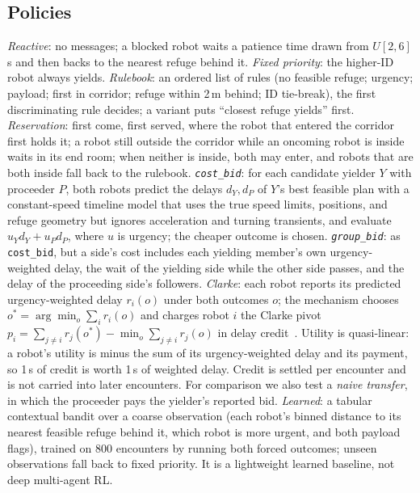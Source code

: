\documentclass[letterpaper,journal]{IEEEtran}
\newcommand{\cb}{\texttt{cost\_bid}}
\newcommand{\gb}{\texttt{group\_bid}}
\begin{document}
\subsection{Policies}\label{sec:pol}
\emph{Reactive}: no messages; a blocked robot waits a patience time drawn from $U[2,6]$\,s and then backs to the nearest refuge behind it. \emph{Fixed priority}: the higher-ID robot always yields. \emph{Rulebook}: an ordered list of rules (no feasible refuge; urgency; payload; first in corridor; refuge within 2\,m behind; ID tie-break), the first discriminating rule decides; a variant puts ``closest refuge yields'' first. \emph{Reservation}: first come, first served, where the robot that entered the corridor first holds it; a robot still outside the corridor while an oncoming robot is inside waits in its end room; when neither is inside, both may enter, and robots that are both inside fall back to the rulebook. \emph{\cb}: for each candidate yielder $Y$ with proceeder $P$, both robots predict the delays $d_Y,d_P$ of $Y$'s best feasible plan with a constant-speed timeline model that uses the true speed limits, positions, and refuge geometry but ignores acceleration and turning transients, and evaluate $u_Y d_Y+u_P d_P$, where $u$ is urgency; the cheaper outcome is chosen. \emph{\gb}: as \cb, but a side's cost includes each yielding member's own urgency-weighted delay, the wait of the yielding side while the other side passes, and the delay of the proceeding side's followers. \emph{Clarke}: each robot reports its predicted urgency-weighted delay $r_i(o)$ under both outcomes $o$; the mechanism chooses $o^\ast=\arg\min_o\sum_i r_i(o)$ and charges robot $i$ the Clarke pivot $p_i=\sum_{j\neq i} r_j(o^\ast)-\min_o\sum_{j\neq i} r_j(o)$ in delay credit~\cite{clarke1971multipart}. Utility is quasi-linear: a robot's utility is minus the sum of its urgency-weighted delay and its payment, so 1\,s of credit is worth 1\,s of weighted delay. Credit is settled per encounter and is not carried into later encounters. For comparison we also test a \emph{naive transfer}, in which the proceeder pays the yielder's reported bid. \emph{Learned}: a tabular contextual bandit over a coarse observation (each robot's binned distance to its nearest feasible refuge behind it, which robot is more urgent, and both payload flags), trained on 800 encounters by running both forced outcomes; unseen observations fall back to fixed priority. It is a lightweight learned baseline, not deep multi-agent RL.
\end{document}
